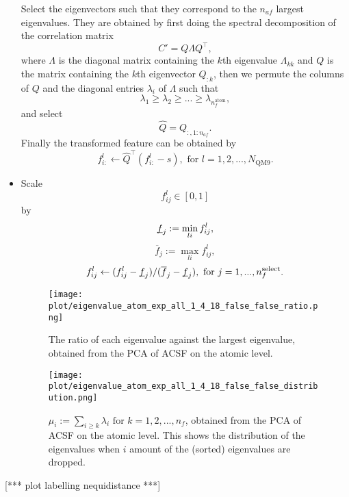 \documentclass[12pt]{article}
\def\att{                    %
        \marginpar[ \hspace*{\fill} \raisebox{-0.2em}{\rule{2mm}{1.2em}} ]
        {\raisebox{-0.2em}{\rule{2mm}{1.2em}} }
        }
\def\at#1{[*** \att #1 ***]}  %
\begin{document}
\begin{itemize}
	Select the eigenvectors such that they correspond to the $n_{af}$ largest eigenvalues. They are obtained by first doing the spectral decomposition of the correlation matrix
	\begin{equation}
		C' = Q\Lambda Q^\top,
	\end{equation}
	where $\Lambda$ is the diagonal matrix containing the $k$th eigenvalue $\Lambda_{kk}$ and $Q$ is the matrix containing the $k$th eigenvector $Q_{:k}$, then we permute the columns of $Q$ and the diagonal entries $\lambda_i$ of $\Lambda$ such that
	\begin{equation}
		\lambda_{1} \geq \lambda_{2} \geq  ... \geq \lambda_{n^\text{atom}_f},
	\end{equation}
	and select
	\begin{equation}
		\hat{Q} = Q_{:, 1:n_{af}}.
	\end{equation}
	Finally the transformed feature can be obtained by
	\begin{equation}
		\label{eq:pca_atom_end}
		f^l_{i:} \leftarrow \hat{Q}^\top(f^l_{i:} - s), \text{ for }l = 1,2,...,N_\text{QM9}.
	\end{equation}
	\item Scale
	\begin{equation}
		\label{eq:scale_1}
		f^l_{ij} \in [0, 1]
	\end{equation}
	by
	\begin{equation}
		\underbar{$f$}_j := \min_{li} f^l_{ij},
	\end{equation}
	\begin{equation}
		\overline{f}_j := \max_{li} f^l_{ij},
	\end{equation}
	\begin{equation}
		f^l_{ij} \leftarrow (f^l_{ij} - \underbar{$f$}_j)/ (\overline{f}_j - \underbar{$f$}_j), \text{ for } j = 1,..., n_f^\text{select}.
		\label{eq:atomminmax}
	\end{equation}
	\begin{figure}[H]
		\label{fig:PCA_atom_rat}
		\centering
		\texttt{[image: plot/eigenvalue\_atom\_exp\_all\_1\_4\_18\_false\_false\_ratio.png]}
		\caption{The ratio of each eigenvalue against the largest eigenvalue, obtained from the PCA of ACSF on the atomic level.}
	\end{figure}
	\begin{figure}[H]
		\label{fig:PCA_atom_dist}
		\centering
		\texttt{[image: plot/eigenvalue\_atom\_exp\_all\_1\_4\_18\_false\_false\_distribution.png]}
		\caption{$\mu_i := \sum_{i\geq k} \lambda_i \text{ for } k = 1,2,...,n_f$, obtained from the PCA of ACSF on the atomic level. This shows the distribution of the eigenvalues when $i$ amount of the (sorted) eigenvalues are dropped.}
	\end{figure}
\end{itemize}
\at{plot labelling nequidistance}
\end{document}
